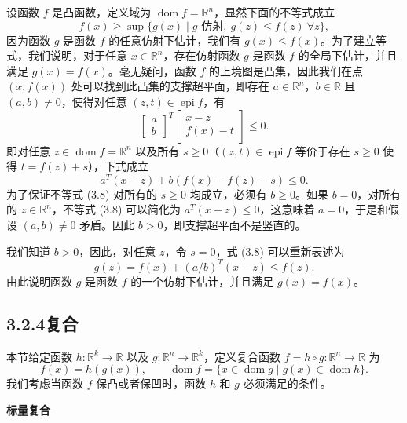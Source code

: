 \documentclass[UTF8,12pt,a4paper,fontset=fandol]{ctexart}
\DeclareMathOperator{\dom}{dom}
\DeclareMathOperator{\epi}{epi}
\begin{document}
设函数 $f$ 是凸函数，定义域为 $\dom f=\mathbb{R}^n$，显然下面的不等式成立
\[
f(x)\geq \sup\{g(x)\mid g\text{ 仿射},\ g(z)\leq f(z)\ \forall z\},
\]
因为函数 $g$ 是函数 $f$ 的任意仿射下估计，我们有 $g(x)\leq f(x)$。为了建立等式，我们说明，对于任意 $x\in\mathbb{R}^n$，存在仿射函数 $g$ 是函数 $f$ 的全局下估计，并且满足 $g(x)=f(x)$。毫无疑问，函数 $f$ 的上境图是凸集，因此我们在点 $(x,f(x))$ 处可以找到此凸集的支撑超平面，即存在 $a\in\mathbb{R}^n$，$b\in\mathbb{R}$ 且 $(a,b)\neq0$，使得对任意 $(z,t)\in\epi f$，有
\[
\begin{bmatrix}
a\\
b
\end{bmatrix}^T
\begin{bmatrix}
x-z\\
f(x)-t
\end{bmatrix}
\leq0.
\]
即对任意 $z\in\dom f=\mathbb{R}^n$ 以及所有 $s\geq0$（$(z,t)\in\epi f$ 等价于存在 $s\geq0$ 使得 $t=f(z)+s$），下式成立
\begin{equation}
a^T(x-z)+b(f(x)-f(z)-s)\leq0.
\tag{3.8}
\end{equation}
为了保证不等式 (3.8) 对所有的 $s\geq0$ 均成立，必须有 $b\geq0$。如果 $b=0$，对所有的 $z\in\mathbb{R}^n$，不等式 (3.8) 可以简化为 $a^T(x-z)\leq0$，这意味着 $a=0$，于是和假设 $(a,b)\neq0$ 矛盾。因此 $b>0$，即支撑超平面不是竖直的。

我们知道 $b>0$，因此，对任意 $z$，令 $s=0$，式 (3.8) 可以重新表述为
\[
g(z)=f(x)+(a/b)^T(x-z)\leq f(z).
\]
由此说明函数 $g$ 是函数 $f$ 的一个仿射下估计，并且满足 $g(x)=f(x)$。

\subsection*{3.2.4\quad 复合}

本节给定函数 $h:\mathbb{R}^k\to\mathbb{R}$ 以及 $g:\mathbb{R}^n\to\mathbb{R}^k$，定义复合函数 $f=h\circ g:\mathbb{R}^n\to\mathbb{R}$ 为
\[
f(x)=h(g(x)),\qquad \dom f=\{x\in\dom g\mid g(x)\in\dom h\}.
\]
我们考虑当函数 $f$ 保凸或者保凹时，函数 $h$ 和 $g$ 必须满足的条件。

\noindent\textbf{标量复合}
\end{document}
